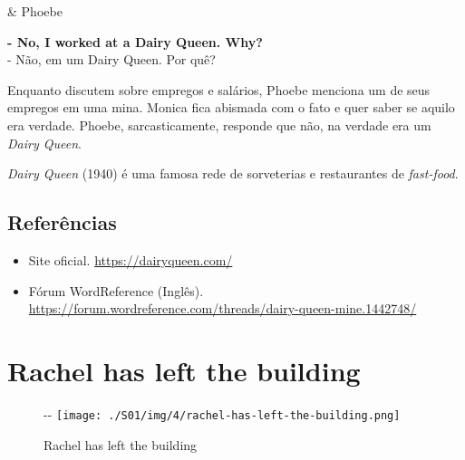 \begin{tcolorbox}[enhanced,center upper,
    drop fuzzy shadow southeast, boxrule=0.3pt,
    lower separated=false,
    colframe=black!30!dialogoBorder,colback=white]
\medskip
\begin{minipage}[c]{0.14\linewidth}
   & \centering \scriptsize{Phoebe}
\end{minipage}
\hspace{.1mm}
\begin{minipage}[c]{0.8\linewidth}
  \textbf{- No, I worked at a Dairy Queen. Why?}\\
  - Não, em um Dairy Queen. Por quê?
\end{minipage}
\end{tcolorbox}

Enquanto discutem sobre empregos e salários, Phoebe menciona um de seus
empregos em uma mina. Monica fica abismada com o fato e quer saber se
aquilo era verdade. Phoebe, sarcasticamente, responde que não, na
verdade era um \emph{Dairy Queen}.

\emph{Dairy Queen} (1940) é uma famosa rede de sorveterias e
restaurantes de \emph{fast-food}.

\hypertarget{referuxeancias}{%
\subsection{Referências}\label{referuxeancias}}

\begin{itemize}
\tightlist
\item
  \sloppy Site oficial. \url{https://dairyqueen.com/}
\item
  \sloppy Fórum WordReference (Inglês). \url{https://forum.wordreference.com/threads/dairy-queen-mine.1442748/}
\end{itemize}

\hypertarget{rachel-has-left-the-building}{%
\section{Rachel has left the
building}\label{rachel-has-left-the-building}}

\begin{figure}[!ht]
  \begin{adjustwidth}{-\oddsidemargin-1in}{-\rightmargin}
    \centering
    \texttt{[image: ./S01/img/4/rachel-has-left-the-building.png]}
    \caption{Rachel has left the building\label{fig:rachel-has-left-the-building}}
  \end{adjustwidth}
\end{figure}


